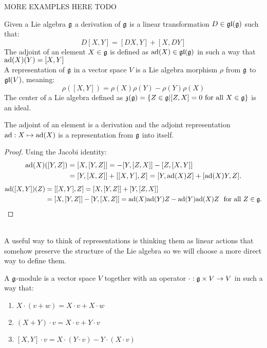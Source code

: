 \begin{ex}
	MORE EXAMPLES HERE TODO \label{MOREEXAMPLES}
\end{ex}
\begin{defi}
	Given a Lie algebra $\mathfrak{g}$ a derivation of $\mathfrak{g}$ is a linear transformation $D\in\mathfrak{gl}(\mathfrak{g})$ such that:
	$$D[X,Y]= [DX,Y]+[X,DY]$$
	The adjoint of an element $X \in \mathfrak{g}$ is defined as $\text{ad}(X) \in \mathfrak{gl}(\mathfrak{g})$ in such a way that $\text{ad}(X)(Y) = [X,Y]$\\
	A representation of $\mathfrak{g}$ in a vector space $V$ is a Lie algebra morphism $\rho$ from $\mathfrak{g}$ to $\mathfrak{gl}(V)$, meaning:
	$$\rho([X,Y]) = \rho(X)\rho(Y)-\rho(Y)\rho(X)$$
	The center of a Lie algebra defined as $\mathfrak{z}(\mathfrak{g}) = \{Z \in \mathfrak{g} | [Z,X] = 0 \text{ for all } X \in \mathfrak{g}\}$ is an ideal.
\end{defi}
\begin{prop}
	The adjoint of an element is a derivation and the adjoint representation $\text{ad}: X \mapsto \text{ad}(X)$ is a representation from $\mathfrak{g}$ into itself.
	\label{13adjointrepresentation}
\end{prop}
\begin{proof}
	Using the Jacobi identity:
	\begin{align*}
	\text{ad}(X)([Y,Z]) &= [X,[Y,Z]] = -[Y,[Z,X]]-[Z,[X,Y]]\\
	&= [Y,[X,Z]] + [[X,Y],Z] = [Y,\text{ad}(X)Z] + [\text{ad}(X)Y,Z].
	\end{align*}
	\begin{align*}
	\ad([X,Y])(Z) &= [[X,Y],Z] = [X,[Y,Z]] + [Y,[Z,X]] \\
	&= [X,[Y,Z]] - [Y,[X,Z]] = \ad(X)\ad(Y)Z - \ad(Y)\ad(X)Z \ \text{ for all } Z \in \g.
	\end{align*}
\end{proof}\\
A useful way to think of representations is thinking them as linear actions that somehow preserve the structure of the Lie algebra so we will choose a more direct way to define them.
\begin{defi}
	A $\mathfrak{g}$-module is a vector space $V$ together with an operator $\cdot: \mathfrak{g} \times V \rightarrow V$ in such a way that:
	\begin{enumerate}[label=(\alph*)]
		\item $X \cdot (v + w) = X \cdot v + X \cdot w$
		\item $(X+Y) \cdot v = X \cdot v + Y \cdot v$
		\item $[X,Y] \cdot v = X \cdot (Y \cdot v) - Y\cdot (X \cdot v)$
	\end{enumerate}
	\label{gmod}
\end{defi}
